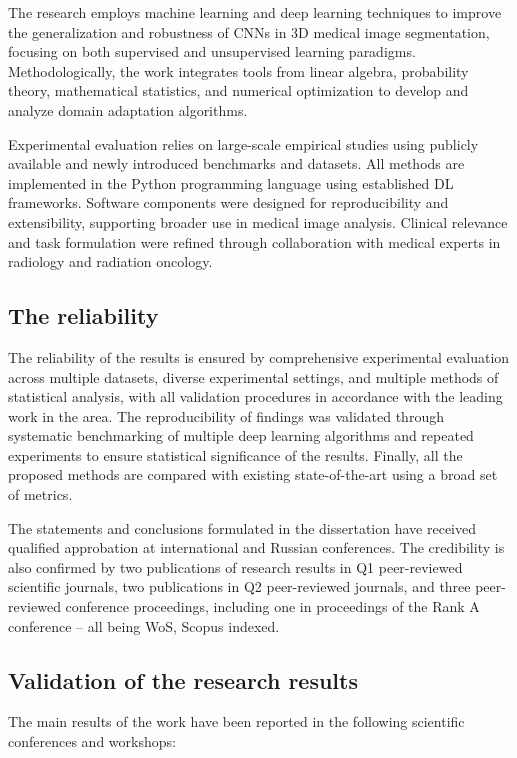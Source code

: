The research employs machine learning and deep learning techniques to improve the generalization and robustness of CNNs in 3D medical image segmentation, focusing on both supervised and unsupervised learning paradigms. Methodologically, the work integrates tools from linear algebra, probability theory, mathematical statistics, and numerical optimization to develop and analyze domain adaptation algorithms.

Experimental evaluation relies on large-scale empirical studies using publicly available and newly introduced benchmarks and datasets. All methods are implemented in the Python programming language using established DL frameworks. Software components were designed for reproducibility and extensibility, supporting broader use in medical image analysis. Clinical relevance and task formulation were refined through collaboration with medical experts in radiology and radiation oncology.


\subsection*{The reliability}

The reliability of the results is ensured by comprehensive experimental evaluation across multiple datasets, diverse experimental settings, and multiple methods of statistical analysis, with all validation procedures in accordance with the leading work in the area. The reproducibility of findings was validated through systematic benchmarking of multiple deep learning algorithms and repeated experiments to ensure statistical significance of the results. Finally, all the proposed methods are compared with existing state-of-the-art using a broad set of metrics.

The statements and conclusions formulated in the dissertation have received qualified approbation at international and Russian conferences. The credibility is also confirmed by two publications of research results in Q1 peer-reviewed scientific journals, two publications in Q2 peer-reviewed journals, and three peer-reviewed conference proceedings, including one in proceedings of the Rank A conference -- all being WoS, Scopus indexed.


\subsection*{Validation of the research results}

The main results of the work have been reported in the following scientific conferences and workshops:

